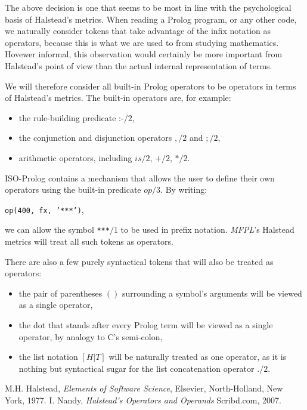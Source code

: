 \documentclass[11pt,a4paper,twoside]{article}
\newcommand{\pname}{\emph{MFPL}}
\begin{document}
\begin{multicols}{2}
The above decision is one that seems to be most in line with the
psychological basis of Halstead's metrics. When reading a Prolog
program, or any other code, we naturally consider tokens that take
advantage of the infix notation as operators, because this is what we
are used to from studying mathematics. Hovewer informal, this
observation would certainly be more important from Halstead's point of
view than the actual internal representation of terms.

We will therefore consider all built-in Prolog operators to be
operators in terms of Halstead's metrics. The built-in operators are,
for example:
\begin{itemize}
\item the rule-building predicate :-$/2$,
\item the conjunction and disjunction operators $,/2$ and $;/2$,
\item arithmetic operators, including $is/2$, $+/2$, $*/2$.
\end{itemize}

ISO-Prolog contains a mechanism that allows the user to define their
own operators using the built-in predicate $op/3$. By writing: 
\begin{center}
\texttt{op(400, fx, '***')},
\end{center}
 we can allow the symbol \texttt{***}$/1$ to be used in prefix
notation. \pname's Halstead metrics will treat all such tokens as
operators.

There are also a few purely syntactical tokens that will also be
treated as operators:
\begin{itemize}
\item the pair of parentheses $()$ surrounding a symbol's arguments
  will be viewed as a single operator,
\item the dot that stands after every Prolog term will be viewed as a
  single operator, by analogy to C's semi-colon,
\item the list notation $[H | T]$ will be naturally treated as one
  operator, as it is nothing but syntactical sugar for the list
  concatenation operator $./2$.
\end{itemize}

\end{multicols}

\newpage

\begin{thebibliography}{halstead}
  M.H. Halstead, 
  \emph{Elements of Software Science}, 
  Elsevier, North-Holland, New York, 1977.
  I. Nandy, 
  \emph{Halstead's Operators and Operands}
  Scribd.com, 2007.
\end{thebibliography}
\end{document}
